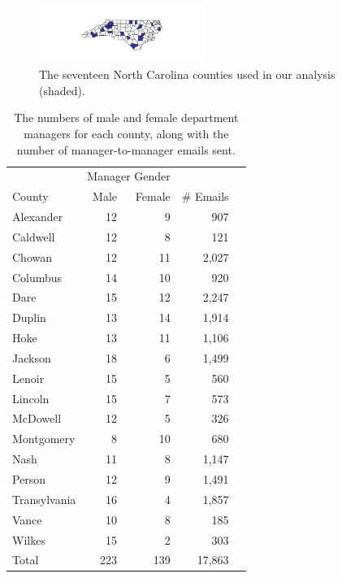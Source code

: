 \documentclass{pnastwo}
\begin{document}
\begin{article}
\begin{figure}
  \centering
  \caption{\label{fig:nc map}The seventeen North Carolina counties
    used in our analysis (shaded).} \centering
  \includegraphics[width=0.48\textwidth]{images/County_Map.pdf}
\end{figure}

\begin{table}
  \centering
  \begin{tabular}{lrrrr}
    \toprule
    & \multicolumn{2}{c}{Manager Gender} & \\
    \cmidrule{2-3}
    County & Male & Female & \# Emails  \\
    \midrule
    Alexander & 12 & 9 & 907   \\
    Caldwell & 12 & 8 & 121     \\
    Chowan & 12 & 11 & 2,027   \\
    Columbus & 14 & 10 & 920   \\
    Dare & 15 & 12 & 2,247    \\
    Duplin & 13 & 14 & 1,914    \\
    Hoke & 13 & 11 & 1,106  \\
    Jackson & 18 & 6 & 1,499    \\
    Lenoir & 15 & 5 & 560  \\
    Lincoln & 15 & 7 & 573   \\
    McDowell & 12 & 5 & 326   \\
    Montgomery & 8 & 10 & 680   \\
    Nash & 11 & 8 & 1,147  \\
    Person & 12 & 9 & 1,491   \\
    Transylvania & 16 & 4 & 1,857  \\
    Vance & 10 & 8 & 185   \\
    Wilkes & 15 & 2 & 303   \\
    \midrule
    Total & 223 & 139 & 17,863 \\
    \bottomrule
  \end{tabular}
  \caption{\label{tab:county aggregate stats} The numbers of male and
    female department managers for each county, along with the number
    of manager-to-manager emails sent.}
\end{table}




\end{article}
\end{document}
